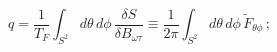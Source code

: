 \begin{equation}
q = \frac{1}{T_F} 
    \int_{S^2} d\theta\,d\phi\,\frac{\delta S}{\delta B_{\omega\tau}} 
\equiv \frac{1}{2\pi} \int_{S^2} d\theta\,d\phi\,{\tilde F}_{\theta\phi}\,;
\end{equation}

